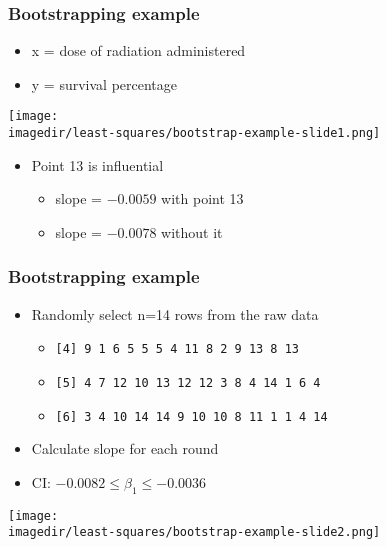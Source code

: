 \begin{frame}\frametitle{Bootstrapping example}
	\begin{itemize}
		\item	x = dose of radiation administered
		\item	y = survival percentage
	\end{itemize}
	\begin{center}
		\texttt{[image: \\imagedir/least-squares/bootstrap-example-slide1.png]}
	\end{center}
	\begin{itemize}
		\item	Point 13 is influential
		\begin{itemize}
			\item	slope = $-0.0059$ with point 13
			\item	slope = $-0.0078$ without it
		\end{itemize}
	\end{itemize}
\end{frame}

\begin{frame}\frametitle{Bootstrapping example}
	\begin{itemize}
		\item	Randomly select n=14 rows from the raw data
		\begin{itemize}
			\item	\texttt{[4] 9 1 6 5 5 5 4 11 8 2 9 13 8 13}
			\item	\texttt{[5] 4 7 12 10 13 12 12 3 8 4 14 1 6 4}
			\item	\texttt{[6] 3 4 10 14 14 9 10 10 8 11 1 1 4 14}
		\end{itemize}
		\item	Calculate slope for each round
		\item	CI: $-0.0082 \leq \beta_1 \leq -0.0036$
	\end{itemize}
	\begin{center}
		\texttt{[image: \\imagedir/least-squares/bootstrap-example-slide2.png]}
	\end{center}
\end{frame}

